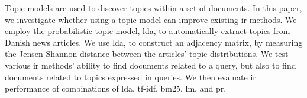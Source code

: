 Topic models are used to discover topics within a set of documents.
In this paper, we investigate whether using a topic model can improve existing \gls{ir} methods.
We employ the probabilistic topic model, \gls{lda}, to automatically extract topics from Danish news articles.
We use \gls{lda}, to construct an adjacency matrix, by measuring the Jensen-Shannon distance between the articles' topic distributions.
We test various \gls{ir} methods' ability to find documents related to a query, but also to find documents related to topics expressed in queries.
We then evaluate \gls{ir} performance of combinations of \gls{lda}, \gls{tf-idf}, \gls{bm25}, \gls{lm}, and \gls{pr}.
